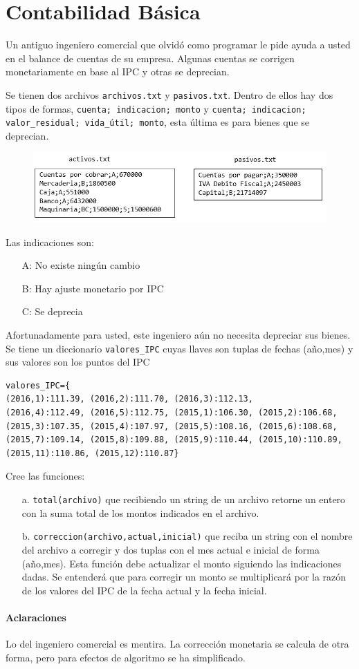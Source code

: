 \section{Contabilidad Básica}

Un antiguo ingeniero comercial que olvidó como programar le pide ayuda a usted en el balance de cuentas de su empresa. Algunas cuentas se corrigen monetariamente en base al IPC y otras se deprecian.

Se tienen dos archivos \texttt{archivos.txt} y \texttt{pasivos.txt}. Dentro de ellos hay dos tipos de formas, \texttt{cuenta; indicacion; monto} y \texttt{cuenta; indicacion; valor\_residual; vida\_útil; monto}, esta última es para bienes que se deprecian.

\begin{figure}[h]
    \centering
    \includegraphics{Imagenes/imagen1.jpg}
\end{figure}

Las indicaciones son:
\begin{itemize}
    \item[A:] No existe ningún cambio
    \item[B:] Hay ajuste monetario por IPC
    \item[C:] Se deprecia
\end{itemize}

Afortunadamente para usted, este ingeniero aún no necesita depreciar sus bienes. 
Se tiene un diccionario \texttt{valores\_IPC} cuyas llaves son tuplas de fechas (año,mes) y sus valores son los puntos del IPC

\begin{lstlisting}[style=consola]
valores_IPC={
(2016,1):111.39, (2016,2):111.70, (2016,3):112.13,
(2016,4):112.49, (2016,5):112.75, (2015,1):106.30, (2015,2):106.68,
(2015,3):107.35, (2015,4):107.97, (2015,5):108.16, (2015,6):108.68,
(2015,7):109.14, (2015,8):109.88, (2015,9):110.44, (2015,10):110.89,
(2015,11):110.86, (2015,12):110.87}
\end{lstlisting}

Cree las funciones:
\begin{itemize}
    \item[a.] \texttt{total(archivo)} que recibiendo un string de un archivo retorne un entero con la suma total de los montos indicados en el archivo.
    \item[b.] \texttt{correccion(archivo,actual,inicial)} que reciba un string con el nombre del archivo a corregir y dos tuplas con el mes actual e inicial de forma (año,mes). Esta función debe actualizar el monto siguiendo las indicaciones dadas. Se entenderá que para corregir un monto se multiplicará por la razón de los valores del IPC de la fecha actual y la fecha inicial.
\end{itemize}

\paragraph{Aclaraciones} Lo del ingeniero comercial es mentira. La corrección monetaria se calcula de otra forma, pero para efectos de algoritmo se ha simplificado.
